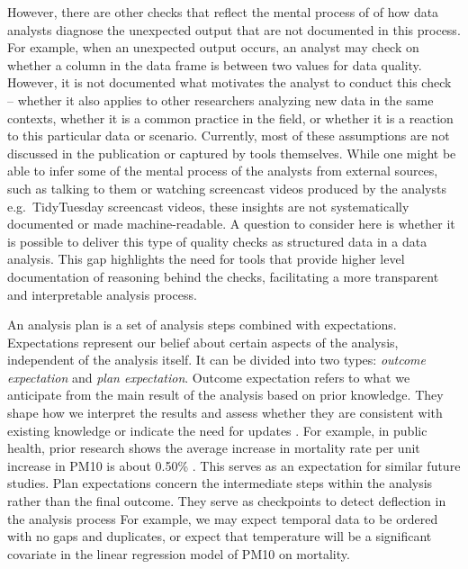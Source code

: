\documentclass[
]{jds}
\begin{document}
However, there are other checks that reflect the mental process of of
how data analysts diagnose the unexpected output that are not documented
in this process. For example, when an unexpected output occurs, an
analyst may check on whether a column in the data frame is between two
values for data quality. However, it is not documented what motivates
the analyst to conduct this check -- whether it also applies to other
researchers analyzing new data in the same contexts, whether it is a
common practice in the field, or whether it is a reaction to this
particular data or scenario. Currently, most of these assumptions are
not discussed in the publication or captured by tools themselves. While
one might be able to infer some of the mental process of the analysts
from external sources, such as talking to them or watching screencast
videos produced by the analysts e.g.~TidyTuesday screencast videos,
these insights are not systematically documented or made
machine-readable. A question to consider here is whether it is possible
to deliver this type of quality checks as structured data in a data
analysis. This gap highlights the need for tools that provide higher
level documentation of reasoning behind the checks, facilitating a more
transparent and interpretable analysis process.

An analysis plan is a set of analysis steps combined with expectations.
Expectations represent our belief about certain aspects of the analysis,
independent of the analysis itself. It can be divided into two types:
\emph{outcome expectation} and \emph{plan expectation}. Outcome
expectation refers to what we anticipate from the main result of the
analysis based on prior knowledge. They shape how we interpret the
results and assess whether they are consistent with existing knowledge
or indicate the need for updates \citep{grolemund_cognitive_2014}. For
example, in public health, prior research shows the average increase in
mortality rate per unit increase in PM10 is about 0.50\%
\citep{liu2019ambient}. This serves as an expectation for similar future
studies. Plan expectations concern the intermediate steps within the
analysis rather than the final outcome. They serve as checkpoints to
detect deflection in the analysis process For example, we may expect
temporal data to be ordered with no gaps and duplicates, or expect that
temperature will be a significant covariate in the linear regression
model of PM10 on mortality.
\end{document}
